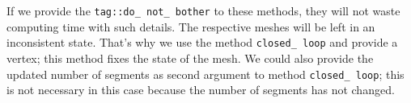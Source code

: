If we provide the {\small\tt\textcolor{tag}{tag}::do\_\,not\_\,bother} to these methods,
they will not waste computing time with such details.
The respective meshes will be left in an inconsistent state.
That's why we use the method {\small\tt closed\_\,loop} and provide a vertex;
this method fixes the state of the mesh.
We could also provide the updated number of segments as second argument to method
{\small\tt closed\_\,loop}; this is not necessary in this case because the number of
segments has not changed.

